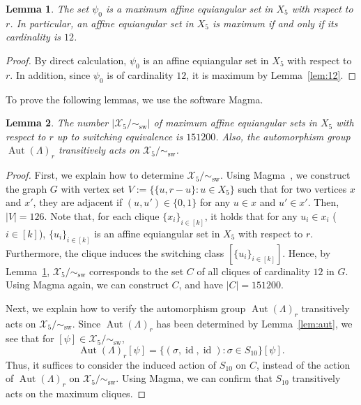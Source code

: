 \documentclass[reqno, 11pt]{amsart}
\numberwithin{equation}{section}
\newtheorem{lem}{Lemma}[section]
\theoremstyle{definition}
\DeclareMathOperator{\Aut}{Aut}
\DeclareMathOperator{\id}{id}
\DeclareMathOperator{\sw}{sw}
\newcommand{\aesf}{\psi}
\newcommand{\cX}{\mathcal{X}}
\newcommand{\sr}{ r } %
\begin{document}
\begin{lem}	\label{lem:X50}
	The set $\aesf_0$ is a maximum affine equiangular set in $X_5$ with respect to $\sr$.
	In particular, an affine equiangular set in $X_5$ is maximum if and only if its cardinality is $12$.
\end{lem}
\begin{proof}
	By direct calculation, $\aesf_0$ is an affine equiangular set in $X_5$ with respect to $\sr$.
	In addition, since $\aesf_0$ is of cardinality $12$, it is maximum by Lemma~\ref{lem:12}.
\end{proof}


To prove the following lemmas, we use the software Magma. %
\begin{lem}
	The number $|\cX_5/\sim_{\sw}|$ of maximum affine equiangular sets in $X_5$ with respect to $\sr$ up to switching equivalence is $151200$.	\label{lem:X5}
	Also, the automorphism group $\Aut(\Lambda)_{\sr}$ transitively acts on $\cX_5/\sim_{\sw}$.
\end{lem}
\begin{proof}
	First, we explain how to determine $\cX_5/\sim_{\sw}$.
	Using Magma~\cite{Magma}, we construct the graph $G$ with vertex set $V := \{ \{ u,r-u\} : u \in X_5 \}$ such that for two vertices $x$ and $x'$, they are adjacent if $(u,u') \in \{0,1\}$ for any $u \in x$ and $u' \in x'$.
	Then, $|V| = 126$.
	Note that, for each clique $\{ x_i \}_{i \in [k]}$, it holds that for any $u_i \in x_i$ ($i \in [k]$), $\{u_i\}_{i \in [k]}$ is an affine equiangular set in $X_5$ with respect to $r$.
	Furthermore, the clique induces the switching class $[ \{u_i\}_{i \in [k]} ]$.
	Hence, by Lemma~\ref{lem:X50}, $\cX_5/\sim_{\sw}$ corresponds to the set $C$ of all cliques of  cardinality $12$ in $G$.
	Using Magma again, we can construct $C$, and have $|C| = 151200$.
	
	Next, we explain how to verify the automorphism group $\Aut(\Lambda)_{\sr}$ transitively acts on $\cX_5/\sim_{\sw}$.
	Since \(\Aut(\Lambda)_r \) has been determined by Lemma~\ref{lem:aut}, we see that for $[\psi] \in \cX_5/ \sim_{\sw}$,
	\[
		\Aut(\Lambda)_{\sr} [\psi] = \{ (\sigma, \id, \id)  :  \sigma \in S_{10} \} [\psi].
	\]
	Thus, it suffices to consider the induced action of $S_{10}$ on $C$, instead of the action of $ \Aut(\Lambda)_r $ on $\cX_5 / \sim_{\sw}$.
	Using Magma, we can confirm that $S_{10}$ transitively acts on the maximum cliques.
\end{proof}
\end{document}
